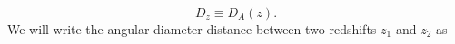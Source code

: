 \begin{equation}
D_z \equiv D_A(z).
\end{equation}
We will write the angular diameter distance between two redshifts $z_1$ and $z_2$  as